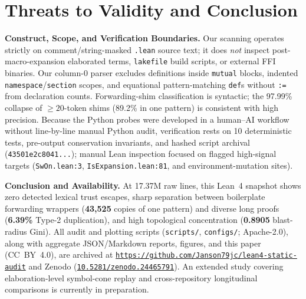 \documentclass[10pt,twocolumn]{article}
\newcommand{\zenodoDoi}{10.5281/zenodo.24465791}
\newcommand{\githubRepo}{https://github.com/Janson79jc/lean4-static-audit}
\newcommand{\probeShaShort}{43501e2c8041}
\begin{document}
\section{Threats to Validity and Conclusion}
\noindent\textbf{Construct, Scope, and Verification Boundaries.} Our scanning operates strictly on comment/string-masked \texttt{.lean} source text; it does \emph{not} inspect post-macro-expansion elaborated terms, \texttt{lakefile} build scripts, or external FFI binaries. Our column-0 parser excludes definitions inside \texttt{mutual} blocks, indented \texttt{namespace}/\texttt{section} scopes, and equational pattern-matching \texttt{def}s without \texttt{:=} from declaration counts. Forwarding-shim classification is syntactic; the 97.99\% collapse of $\ge 20$-token shims (89.2\% in one pattern) is consistent with high precision. Because the Python probes were developed in a human--AI workflow without line-by-line manual Python audit, verification rests on 10 deterministic tests, pre-output conservation invariants, and hashed script archival (\texttt{\probeShaShort...}); manual Lean inspection focused on flagged high-signal targets (\texttt{SwOn.lean:3}, \texttt{IsExpansion.lean:81}, and environment-mutation sites).

\noindent\textbf{Conclusion and Availability.} At 17.37M raw lines, this Lean~4 snapshot shows zero detected lexical trust escapes, sharp separation between boilerplate forwarding wrappers (\textbf{43,525} copies of one pattern) and diverse long proofs (\textbf{6.39\%} Type-2 duplication), and high topological concentration (\textbf{0.8905} blast-radius Gini). All audit and plotting scripts (\texttt{scripts/}, \texttt{configs/}; Apache-2.0), along with aggregate JSON/Markdown reports, figures, and this paper (CC~BY~4.0), are archived at \href{\githubRepo}{\texttt{\githubRepo}} and Zenodo (\href{https://doi.org/\zenodoDoi}{\texttt{\zenodoDoi}}). An extended study covering elaboration-level symbol-cone replay and cross-repository longitudinal comparisons is currently in preparation.


{\footnotesize\sloppy

}
\end{document}

